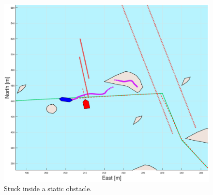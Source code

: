 \clearpage
\begin{figure}[!ht] %
    \centering
    \includegraphics[width=\textwidth]{Images/Figures/Extra_Stuff/w_optstuck}
    \caption{Stuck inside a static obstacle.}
    \label{FIG: wopt stuck in static obstacle}
\end{figure}

